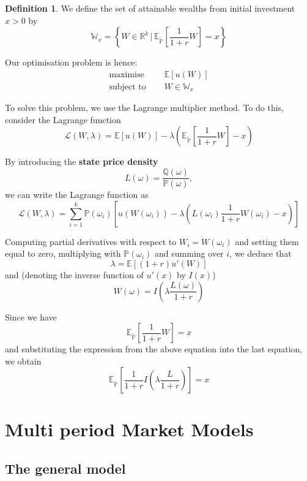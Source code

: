 \documentclass[10pt, oneside, reqno]{amsart}
\theoremstyle{plain}%
\theoremstyle{definition}
\newtheorem{defn}[thm]{Definition}
\theoremstyle{remark}
\newcommand{\expc}[1]{\mathbb{E}\left[#1\right]}
\newcommand{\expp}[1]{\mathbb{E}_{\rnm}\left[#1\right]}
\newcommand{\prob}[1]{\mathbb{P}(#1)}
\newcommand{\given}{ \, | \,}
\newcommand{\Q}{\mathbb{Q}}
\newcommand{\R}{\mathbb{R}}
\newcommand{\F}{\mathbb{F}}
\newcommand{\rnm}{\tilde{\mathbb{P}}}
\begin{document}
\begin{defn}
    We define the set of attainable wealths from initial investment $x > 0$ by \[
        \mathbb{W}_x = \left\{ W  \in \R^k \given \expp{\frac{1}{1+r}W} = x \right\}
    \]
    
    Our optimisation problem is hence: \begin{align*}
        \text{maximise } \quad &\expc{u(W)} \\
        \text{subject to } \quad &W \in \mathbb{W}_x
    \end{align*}
\end{defn}


To solve this problem, we use the Lagrange multiplier method.  To do this, consider the Lagrange function \[
    \mathcal{L}(W,\lambda) = \expc{u(W)} - \lambda\left(\expp{\frac{1}{1+r}W} - x \right)
\]

By introducing the \textbf{state price density} \[
    L(\omega) = \frac{\Q(\omega)}{\mathbb{P}(\omega)},
\] we can write the Lagrange function as \[
    \mathcal{L}(W,\lambda) = \sum_{i=1}^k \prob{\omega_i} \left[ u(W(\omega_i)) - \lambda\left(L(\omega_i) \frac{1}{1+r} W(\omega_i) - x \right)\right]
\]

Computing partial derivatives with respect to $W_i = W(\omega_i)$ and setting them equal to zero, multiplying with $\prob{\omega_i}$ and summing over $i$, we deduce that \[
    \lambda = \expc{(1+r) u'(W)}
\] and (denoting the inverse function of $u'(x)$ by $I(x)$) \[
    W(\omega) = I \left(\lambda \frac{L(\omega)}{1+r}\right)
\]

Since we have \[
    \expp{\frac{1}{1+r}W} = x
\] and substituting the expression from the above equation into the last equation, we obtain\[
    \expp{\frac{1}{1+r} I \left(\lambda \frac{L}{1+r}\right)} = x
\]

\renewcommand{\F}{\mathcal{F}}

\newcommand{\ott}{0 \leq t \leq T}

\section{Multi period Market Models} %
\label{sec:multi_period_market_models}
\subsection{The general model} %
\label{sub:the_general_model}
\end{document}
